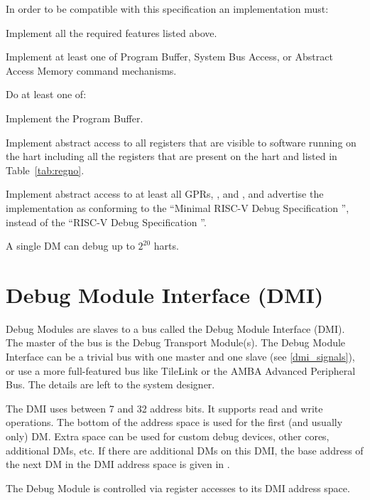 \begin{steps}{In order to be compatible with this specification an
    implementation must:}
\item Implement all the required features listed above.
\item Implement at least one of Program Buffer, System Bus Access, or Abstract
    Access Memory command mechanisms.
\item
    \begin{steps}{Do at least one of:}
        \item Implement the Program Buffer.
        \item Implement abstract access to all registers that are visible to
            software running on the hart including all the registers that are
            present on the hart and listed in Table~\ref{tab:regno}.
        \item Implement abstract access to at least all GPRs, \RcsrDcsr, and
            \RcsrDpc, and advertise the implementation as conforming to the
            ``Minimal RISC-V Debug Specification \versionnum'', instead of the
            ``RISC-V Debug Specification \versionnum''.
    \end{steps}
\end{steps}

A single DM can debug up to $2^{20}$ harts.

\section{Debug Module Interface (DMI)} \label{dmi}

Debug Modules are slaves to a bus called the Debug Module Interface (DMI). The
master of the bus is the Debug Transport Module(s).
The Debug Module Interface can be a trivial bus with one master and one slave (see \ref{dmi_signals}),
or use a more full-featured bus like TileLink or the AMBA Advanced Peripheral
Bus. The details are left to the system designer.

The DMI uses between 7 and 32 address bits.  It supports read and write
operations.  The bottom of the address space is
used for the first (and usually only) DM. Extra space can be used for custom
debug devices, other cores, additional DMs, etc. If there are additional DMs
on this DMI, the base address of the next DM in the DMI address space is given
in \RdmNextdm.

The Debug Module is controlled via register accesses to its DMI address space.

